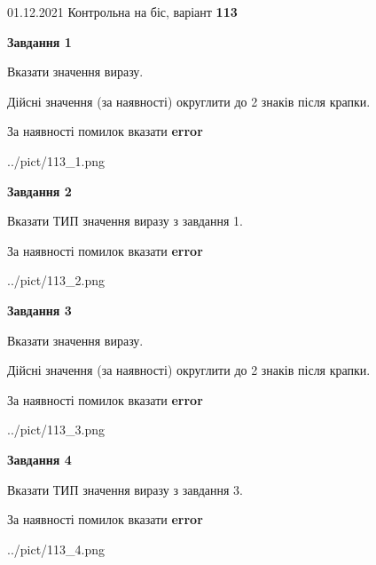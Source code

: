 \documentclass[11pt, ukrainian]{article}
\begin{document}
{01.12.2021 Контрольна на біс, варіант  \No \textbf { 113 }\par}
{
\begin {large}
{\begin {center}\textbf{Завдання 1}\end {center}}\par
Вказати значення виразу. \par
Дійсні значення (за наявності) округлити до 2 знаків після крапки. \par
За наявності помилок вказати \textbf{error}

\begin{center}
	{../pict/113_1.png}
\end{center}
\newpage

{\begin {center}\textbf{Завдання 2}\end {center}}\par
Вказати ТИП значення виразу з завдання 1. \par
За наявності помилок вказати \textbf{error}

\begin{center}
	{../pict/113_2.png}
\end{center}
\newpage

{\begin {center}\textbf{Завдання 3}\end {center}}\par
Вказати значення виразу. \par
Дійсні значення (за наявності) округлити до 2 знаків після крапки. \par
За наявності помилок вказати \textbf{error}

\begin{center}
	{../pict/113_3.png}
\end{center}
\newpage

{\begin {center}\textbf{Завдання 4}\end {center}}\par
Вказати ТИП значення виразу з завдання 3. \par
За наявності помилок вказати \textbf{error}

\begin{center}
	{../pict/113_4.png}
\end{center}
\newpage


\end{large}}
\end{document}
